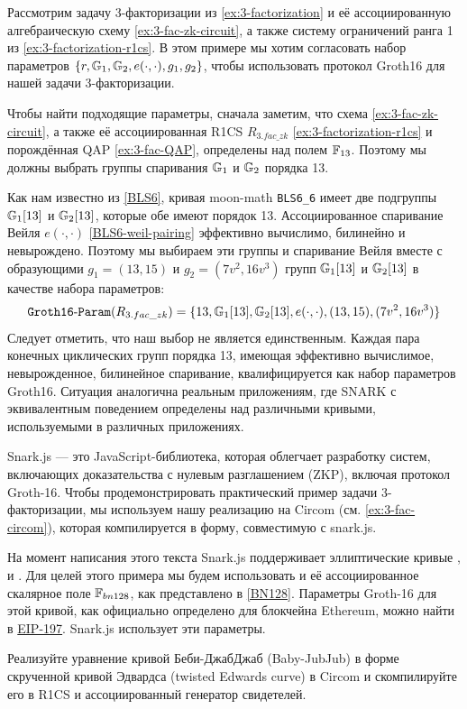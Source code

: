 \begin{example}
\label{ex:3-fac-groth-16-params} Рассмотрим задачу 3-факторизации из \ref{ex:3-factorization} и её ассоциированную алгебраическую схему \ref{ex:3-fac-zk-circuit}, а также систему ограничений ранга 1 из \ref{ex:3-factorization-r1cs}. В этом примере мы хотим согласовать набор параметров $\{r, \mathbb{G}_1, \mathbb{G}_2, e(\cdot,\cdot), g_1, g_2\}$, чтобы использовать протокол Groth16 для нашей задачи 3-факторизации.

Чтобы найти подходящие параметры, сначала заметим, что схема \ref{ex:3-fac-zk-circuit}, а также её ассоциированная R1CS $R_{3.fac\_zk}$ \ref{ex:3-factorization-r1cs} и порождённая QAP \ref{ex:3-fac-QAP}, определены над полем $\mathbb{F}_{13}$. Поэтому мы должны выбрать группы спаривания $\mathbb{G}_1$ и $\mathbb{G}_2$ порядка 13.

Как нам известно из \ref{BLS6}, кривая moon-math \texttt{BLS6\_6} имеет две подгруппы $\mathbb{G}_1[13]$ и $\mathbb{G}_2[13]$, которые обе имеют порядок 13. Ассоциированное спаривание Вейля $e(\cdot,\cdot)$ \ref{BLS6-weil-pairing} эффективно вычислимо, билинейно и невырождено. Поэтому мы выбираем эти группы и спаривание Вейля вместе с образующими $g_1 = (13,15)$ и $g_2=(7v^2,16v^3)$ групп $\mathbb{G}_1[13]$ и $\mathbb{G}_2[13]$ в качестве набора параметров:
$$
\mathtt{Groth16\text{-}Param}(R_{3.fac\_zk})= \{ 13, \mathbb{G}_1[13], \mathbb{G}_2[13], e(\cdot,\cdot), (13,15),(7v^2,16v^3) \}
$$
Следует отметить, что наш выбор не является единственным. Каждая пара конечных циклических групп порядка 13, имеющая эффективно вычислимое, невырожденное, билинейное спаривание, квалифицируется как набор параметров Groth16. Ситуация аналогична реальным приложениям, где SNARK с эквивалентным поведением определены над различными кривыми, используемыми в различных приложениях.
\end{example}
\begin{example}
\label{ex:3-fac-groth-16-params-circom} Snark.js --- это JavaScript-библиотека, которая облегчает разработку систем, включающих доказательства с нулевым разглашением (ZKP), включая протокол Groth-16. Чтобы продемонстрировать практический пример задачи 3-факторизации, мы используем нашу реализацию на Circom (см. \ref{ex:3-fac-circom}), которая компилируется в форму, совместимую с snark.js.

На момент написания этого текста Snark.js поддерживает эллиптические кривые ,  и . Для целей этого примера мы будем использовать  и её ассоциированное скалярное поле $\mathbb{F}_{bn128}$, как представлено в \ref{BN128}. Параметры Groth-16 для этой кривой, как официально определено для блокчейна Ethereum, можно найти в \href{https://github.com/ethereum/EIPs/blob/master/EIPS/eip-197.md}{EIP-197}. Snark.js использует эти параметры.
\end{example}
\begin{exercise}
\label{ex:baby-jubjub-circom} Реализуйте уравнение кривой Беби-ДжабДжаб (Baby-JubJub) в форме скрученной кривой Эдвардса (twisted Edwards curve) в Circom и скомпилируйте его в R1CS и ассоциированный генератор свидетелей.
\end{exercise}

